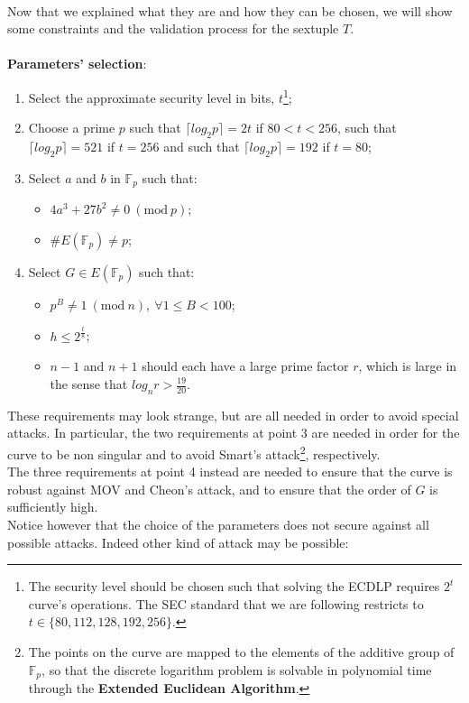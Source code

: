 \\
Now that we explained what they are and how they can be chosen, we will show some constraints and the validation process for the sextuple $T$.
\\
\\
{\bf Parameters' selection}: 
\begin{enumerate}
	\item Select the approximate security level in bits, $t$\footnote{The security level should be chosen such that solving the ECDLP requires $2^t$ curve's operations. The SEC standard that we are following restricts to $t \in \{80, 112, 128, 192, 256\}$.};
	\item Choose a prime $p$ such that $\lceil log_2p\rceil = 2t$ if $80 < t < 256$, such that $\lceil log_2p\rceil = 521$ if $t = 256$ and such that $\lceil log_2p\rceil = 192$ if $t = 80$;
	\item Select $a$ and $b$ in $\mathbb{F}_p$ such that:
	\begin{itemize}
		\item $4a^3 + 27b^2 \neq 0 \ (\text{mod} \ p)$;
		\item $\#E(\mathbb{F}_p) \neq p$;
	\end{itemize} 
	\item Select $G \in E(\mathbb{F}_p)$ such that:
	\begin{itemize}
		\item $p^B \neq 1 \ (\text{mod} \ n), \ \forall 1 \leq B < 100$;
		\item $h \leq 2^{\frac{t}{8}}$;
		\item $n - 1$ and $n + 1$ should each have a large prime factor $r$, which is large in the sense that $log_nr > \frac{19}{20}$.
	\end{itemize}
\end{enumerate}
These requirements may look strange, but are all needed in order to avoid special attacks. In particular, the two requirements at point 3 are needed in order for the curve to be non singular and to avoid Smart's attack\footnote{The points on the curve are mapped to the elements of the additive group of $\mathbb{F}_p$, so that the discrete logarithm problem is solvable in polynomial time through the {\bf Extended Euclidean Algorithm}.}, respectively.
\\
The three requirements at point 4 instead are needed to ensure that the curve is robust against MOV and Cheon's attack, and to ensure that the order of $G$ is sufficiently high.
\\
Notice however that the choice of the parameters does not secure against all possible attacks. Indeed other kind of attack may be possible:
